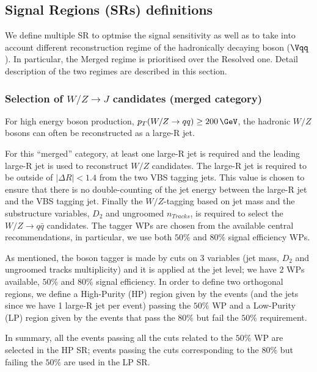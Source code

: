 \clearpage
\subsection{Signal Regions (SRs) definitions}
\label{subsec:sr_selection}

We define multiple SR to optmise the signal sensitivity as well as 
to take into account different reconstruction regime of the hadronically
decaying boson ($\Vqq$). In particular, the Merged regime is prioritised
over the Resolved one. Detail description of the two regimes are described 
in this section.

\subsubsection{Selection of $W/Z \to J$ candidates (merged category)}
\label{subsubsec:merged_jets_selection}

For high energy boson production, $p_{T}(W/Z \rightarrow qq) \geq 200\,\GeV$, the hadronic $W/Z$ bosons can often be reconstructed as a large-R jet.

For this ``merged'' category, at least one large-R jet is required and 
the leading large-R jet is used to reconstruct $W/Z$ candidates.
%
The large-R jet is required to be outside of $|\Delta R| < 1.4$ from the two VBS tagging jets.
This value is chosen to ensure that there is no double-counting of the jet energy between the large-R jet and the VBS tagging jet.
%
Finally the $W/Z$-tagging based on jet mass and the substructure variables, $D_2$ and ungroomed $n_{Tracks}$, is required to select the $W/Z \to q\bar{q}$ candidates.
The tagger WPs are chosen from the available central recommendations, in particular, we use both $50\%$ and $80\%$ signal efficiency WPs.

As mentioned, the boson tagger is made by cuts on 3 variables (jet mass, $D_2$ and ungroomed tracks multiplicity) 
and it is applied at the jet level; we have 2 WPs available, $50\%$ and $80\%$ signal efficiency. 
In order to define two orthogonal regions, we define a High-Purity (HP) region given by the events 
(and the jets since we have 1 large-R jet per event) passing the $50\%$ WP 
and a Low-Purity (LP) region given by the events that pass the $80\%$ but fail the $50\%$ requirement.

In summary, all the events passing all the cuts related to the $50\%$ WP are selected in the HP SR;
events passing the cuts corresponding to the $80\%$ but failing the $50\%$ are used in the LP SR.

